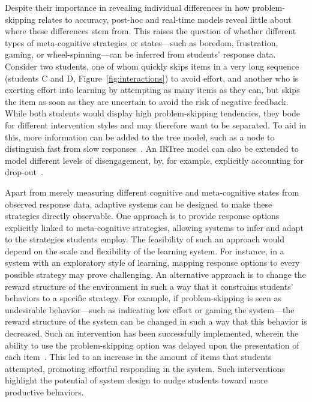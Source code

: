 \documentclass[11pt]{article}
\begin{document}
Despite their importance in revealing individual differences in how problem-skipping relates to accuracy, post-hoc and real-time models reveal little about where these differences stem from. This raises the question of whether different types of meta-cognitive strategies or states---such as boredom, frustration, gaming, or wheel-spinning---can be inferred from students' response data. Consider two students, one of whom quickly skips items in a very long sequence (students C and D, Figure~\ref{fig:interactions}) to avoid effort, and another who is exerting effort into learning by attempting as many items as they can, but skips the item as soon as they are uncertain to avoid the risk of negative feedback. While both students would display high problem-skipping tendencies, they bode for different intervention styles and may therefore want to be separated. To aid in this, more information can be added to the tree model, such as a node to distinguish fast from slow responses~\parencite{coomans2016distinguishing, hofman2018fast}. An IRTree model can also be extended to model different levels of disengagement, by, for example, explicitly accounting for drop-out~\parencite{huang2020mixture}. 

Apart from merely measuring different cognitive and meta-cognitive states from observed response data, adaptive systems can be designed to make these strategies directly observable. One approach is to provide response options explicitly linked to meta-cognitive strategies, allowing systems to infer and adapt to the strategies students employ. The feasibility of such an approach would depend on the scale and flexibility of the learning system. For instance, in a system with an exploratory style of learning, mapping response options to every possible strategy may prove challenging. An alternative approach is to change the reward structure of the environment in such a way that it constrains students' behaviors to a specific strategy. For example, if problem-skipping is seen as undesirable behavior---such as indicating low effort or gaming the system---the reward structure of the system can be changed in such a way that this behavior is decreased. Such an intervention has been successfully implemented, wherein the ability to use the problem-skipping option was delayed upon the presentation of each item~\parencite{savi2018delaying}. This led to an increase in the amount of items that students attempted, promoting effortful responding in the system. Such interventions highlight the potential of system design to nudge students toward more productive behaviors.
\end{document}
